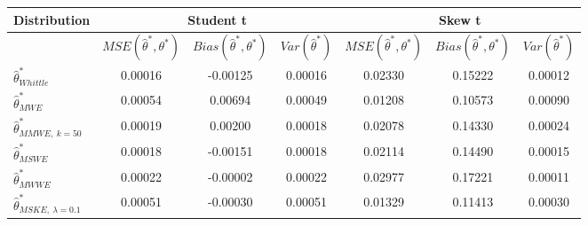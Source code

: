 \documentclass[
  11pt,
]{article}
\begin{document}
\begin{table}[h]
\centering
\begin{tabular}{|l|c|c|c|c|c|c|}
\hline
\textbf{Distribution}                   & \multicolumn{3}{c|}{\textbf{Student t}}                                                           & \multicolumn{3}{c|}{\textbf{Skew t}}                                                                                                                             \\ \hline
\textbf{}                               & $MSE(\hat \theta^*, \theta^*)$ & $Bias(\hat \theta^*, \theta^*)$ & $Var(\hat \theta^*)$ & \multicolumn{1}{l|}{$MSE(\hat \theta^*, \theta^*)$} & \multicolumn{1}{l|}{$Bias(\hat \theta^*, \theta^*)$} & \multicolumn{1}{l|}{$Var(\hat \theta^*)$} \\ \hline
$\hat \theta^*_{Whittle}$               & 0.00016                        & -0.00125                        & 0.00016                        & 0.02330                                             & 0.15222                                              & 0.00012                                             \\ \hline
$\hat \theta^*_{MWE}$                   & 0.00054                        & 0.00694                         & 0.00049                        & 0.01208                                             & 0.10573                                              & 0.00090                                             \\ \hline
$\hat \theta^*_{MMWE, \ k = 50}$        & 0.00019                        & 0.00200                         & 0.00018                        & 0.02078                                             & 0.14330                                              & 0.00024                                             \\ \hline
$\hat \theta^*_{MSWE}$                  & 0.00018                        & -0.00151                        & 0.00018                        & 0.02114                                             & 0.14490                                              & 0.00015                                             \\ \hline
$\hat \theta^*_{MWWE}$                  & 0.00022                        & -0.00002                        & 0.00022                        & 0.02977                                             & 0.17221                                              & 0.00011                                             \\ \hline
$\hat \theta^*_{MSKE, \ \lambda = 0.1}$ & 0.00051                        & -0.00030                        & 0.00051                        & 0.01329                                             & 0.11413                                              & 0.00030                                             \\ \hline

\end{tabular}
\end{table}
\end{document}
